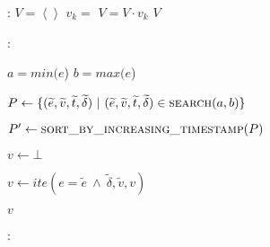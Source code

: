 \documentclass{article}
\begin{document}
\begin{algorithm}

  \begin{algorithmic}[1]
	:
		\State $V = \left\langle \right\rangle$ 
			\State $v_k = $ 
			\State $V = V \cdot v_k$
		\EndFor
		\State \Return $V$
	\EndFunction
  \end{algorithmic}

  \bigskip

  \begin{algorithmic}[1]
	:

		\State $a = min(e$)
		\State $b = max(e$)

		\State $P \leftarrow \{ (\widetilde{e}, \widetilde{v}, \widetilde{t}, \widetilde{\delta})~|~(\widetilde{e}, \widetilde{v}, \widetilde{t}, \widetilde{\delta}) \in \Call{search}{a, b}\}$

		\State $P' \leftarrow \Call{sort\_by\_increasing\_timestamp}{P}$

		\State $v \leftarrow \bot$

			\State $v \leftarrow ite(e = \widetilde{e}~\wedge~\widetilde{\delta}, \widetilde{v}, v) $
		\EndFor

		\State \Return $v$
	\EndFunction
  \end{algorithmic}
  
  \bigskip

  \begin{algorithmic}[1]
	:
		\State \Return
	\EndFunction
  \end{algorithmic}

\end{algorithm}
\end{document}
